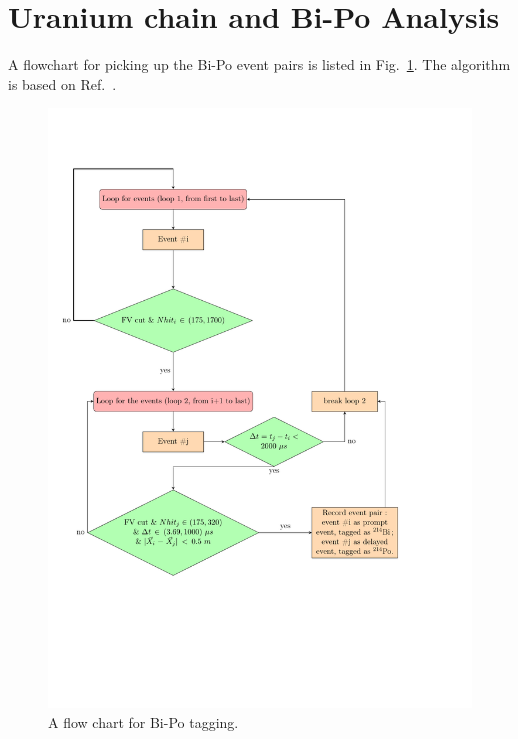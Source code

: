 \section{Uranium chain and Bi-Po Analysis}\label{appendix:bipo}
A flowchart for picking up the Bi-Po event pairs is listed in Fig.~\ref{biPo_flowchart}. The algorithm is based on Ref.~\cite{joshW1}.
 
\begin{figure}[!htb]
	\centering
	\includegraphics[width=15cm]{flowchart_latex.pdf}
	\vspace*{-45mm}
	\caption{A flow chart for Bi-Po tagging.\label{biPo_flowchart}}
\end{figure}